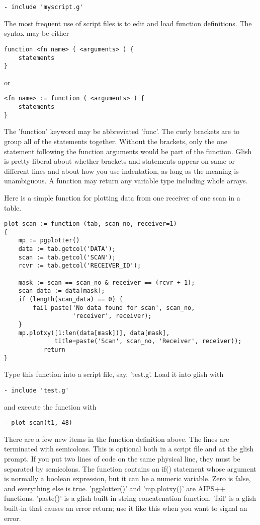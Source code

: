 \begin{verbatim}
- include 'myscript.g'
\end{verbatim}

The most frequent use of script files is to edit and load function
definitions.  The syntax may be either

\begin{verbatim}
function <fn name> ( <arguments> ) {
    statements
}
\end{verbatim}
or
\begin{verbatim}
<fn name> := function ( <arguments> ) {
    statements
}
\end{verbatim}

The 'function' keyword may be abbreviated 'func'.  The curly brackets are
to group all of the statements together.  Without the brackets, only the
one statement following the function arguments would be part of the
function.  Glish is pretty liberal about whether brackets and statements
appear on same or different lines and about how you use indentation, as
long as the meaning is unambiguous.  A function may return any variable
type including whole arrays.

    Here is a simple function for plotting data from one receiver of one
scan in a table.

\begin{verbatim}
plot_scan := function (tab, scan_no, receiver=1)
{
    mp := pgplotter()
    data := tab.getcol('DATA');
    scan := tab.getcol('SCAN');
    rcvr := tab.getcol('RECEIVER_ID');

    mask := scan == scan_no & receiver == (rcvr + 1);
    scan_data := data[mask];
    if (length(scan_data) == 0) {
        fail paste('No data found for scan', scan_no, 
                   'receiver', receiver);
    }
    mp.plotxy([1:len(data[mask])], data[mask], 
              title=paste('Scan', scan_no, 'Receiver', receiver));
           return
}
\end{verbatim}

Type this function into a script file, say, 'test.g'.  Load it into glish
with

\begin{verbatim}
- include 'test.g'
\end{verbatim}

and execute the function with

\begin{verbatim}
- plot_scan(t1, 48)
\end{verbatim}

    There are a few new items in the function definition above.  The lines
are terminated with semicolons.  This is optional both in a script file and
at the glish prompt.  If you put two lines of code on the same physical
line, they must be separated by semicolons.  The function contains an if()
statement whose argument is normally a boolean expression, but it can be a
numeric variable.  Zero is false, and everything else is true.  'pgplotter()'
and 'mp.plotxy()'
are AIPS++ functions.  'paste()' is a glish built-in string concatenation
function. 'fail' is a glish built-in that causes an error return; use
it like this when you want to signal an error.

